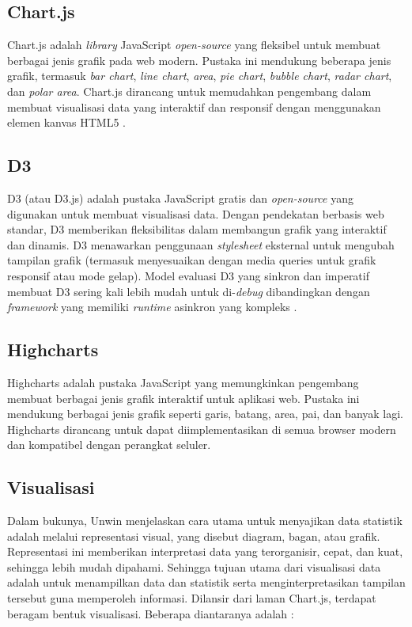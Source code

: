 \subsection{Chart.js}
Chart.js adalah \textit{library} JavaScript \textit{open-source} yang fleksibel untuk membuat berbagai jenis grafik pada web modern. Pustaka ini mendukung beberapa jenis grafik, termasuk \textit{bar chart}, \textit{line chart}, \textit{area}, \textit{pie chart}, \textit{bubble chart}, \textit{radar chart}, dan \textit{polar area}. Chart.js dirancang untuk memudahkan pengembang dalam membuat visualisasi data yang interaktif dan responsif dengan menggunakan elemen kanvas HTML5 \cite{ChartJs}.

\subsection{D3}
D3 (atau D3.js) adalah pustaka JavaScript gratis dan \textit{open-source} yang digunakan untuk membuat visualisasi data. Dengan pendekatan berbasis web standar, D3 memberikan fleksibilitas dalam membangun grafik yang interaktif dan dinamis.  D3 menawarkan penggunaan \textit{stylesheet} eksternal untuk mengubah tampilan grafik (termasuk menyesuaikan dengan media queries untuk grafik responsif atau mode gelap). Model evaluasi D3 yang sinkron dan imperatif membuat D3 sering kali lebih mudah untuk di-\textit{debug} dibandingkan dengan \textit{framework} yang memiliki \textit{runtime} asinkron yang kompleks \cite{D3}.

\subsection{Highcharts}
Highcharts adalah pustaka JavaScript yang memungkinkan pengembang membuat berbagai jenis grafik interaktif untuk aplikasi web. Pustaka ini mendukung berbagai jenis grafik seperti garis, batang, area, pai, dan banyak lagi. Highcharts dirancang untuk dapat diimplementasikan di semua browser modern dan kompatibel dengan perangkat seluler\cite{Highcharts}.

\subsection{Visualisasi}
Dalam bukunya, Unwin \cite{Unwin2020} menjelaskan cara utama untuk menyajikan data statistik adalah melalui representasi visual, yang disebut diagram, bagan, atau grafik. Representasi ini memberikan interpretasi data yang terorganisir, cepat, dan kuat, sehingga lebih mudah dipahami. Sehingga tujuan utama dari visualisasi data adalah untuk menampilkan data dan statistik serta menginterpretasikan tampilan tersebut guna memperoleh informasi. Dilansir dari laman Chart.js, terdapat beragam bentuk visualisasi. Beberapa diantaranya adalah : 


